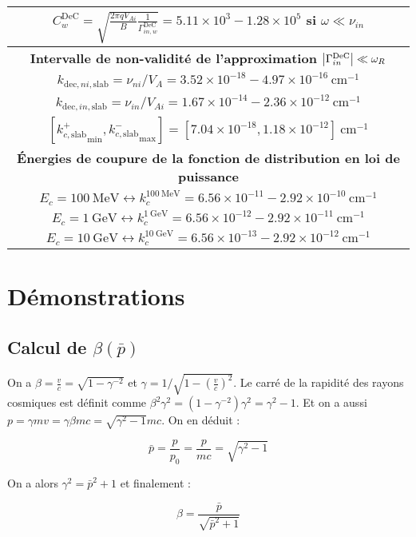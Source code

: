 \documentclass[10pt,a4paper]{article}
\begin{document}
\begin{center}
\begin{tabular}{|c|}
$C^\mathrm{DeC}_w = \sqrt{\frac{2\pi qV_{Ai}}{B} \frac{1}{\Gamma^\mathrm{DeC}_{in,w}}} = 5.11\times 10^3 - 1.28 \times 10^5$ si $\omega \ll \nu_{in}$ \\ 
\hline 
\hline
\bf{Intervalle de non-validité de l'approximation $\abs{\Gamma^\mathrm{DeC}_{in}} \ll \omega_R$} \\ 
\hline
$k_{\mathrm{dec},ni,\mathrm{slab}} = \nu_{ni}/V_A = 3.52\times 10^{-18} - 4.97 \times 10^{-16} ~ \mathrm{cm}^{-1}$ \\ 
$k_{\mathrm{dec},in,\mathrm{slab}} = \nu_{in}/V_{Ai} = 1.67\times 10^{-14} - 2.36 \times 10^{-12} ~ \mathrm{cm}^{-1}$ \\ 
$\left[{k^+_{c,\mathrm{slab}}}_\mathrm{min}, {k^-_{c,\mathrm{slab}}}_\mathrm{max} \right] = [7.04 \times 10^{-18}, 1.18\times 10^{-12}] ~ \mathrm{cm}^{-1}$ \\ 
\hline
\hline
\bf{Énergies de coupure de la fonction de distribution en loi de puissance} \\ 
\hline
$E_c = 100~\mathrm{MeV} \leftrightarrow k^{100~\mathrm{MeV}}_c = 6.56\times 10^{-11} - 2.92 \times 10^{-10}~\mathrm{cm}^{-1}$ \\ 
$E_c = 1~\mathrm{GeV} \leftrightarrow k^{1~\mathrm{GeV}}_c = 6.56\times 10^{-12} - 2.92 \times 10^{-11} ~\mathrm{cm}^{-1}$     \\ 
$E_c = 10~\mathrm{GeV} \leftrightarrow k^{10~\mathrm{GeV}}_c = 6.56\times 10^{-13} - 2.92 \times 10^{-12}~\mathrm{cm}^{-1}$   \\ 
\hline

\end{tabular}
\label{param_DeC} 

\end{center}



\section{Démonstrations} 

	\subsection*{Calcul de $\beta(\bar{p})$}
On a $\beta = \frac{v}{c} = \sqrt{1 - \gamma^{-2}}$ et $\gamma = 1/\sqrt{1 - \left(\frac{v}{c} \right)^2}$. Le carré de la rapidité des rayons cosmiques est définit comme $\beta^2 \gamma^2 = (1 - \gamma^{-2})\gamma^2 = \gamma^2 - 1$. Et on a aussi $p = \gamma mv = \gamma \beta mc = \sqrt{\gamma^2 - 1}mc$. On en déduit : 

\begin{equation}
	\bar{p} = \frac{p}{p_0} = \frac{p}{mc} = \sqrt{\gamma^2 - 1}
\end{equation}

On a alors $\gamma^2 = \bar{p}^2 + 1$ et finalement : 

\begin{equation}
	\beta = \frac{\bar{p}}{\sqrt{\bar{p}^2 + 1}}
\end{equation}
\end{document}

